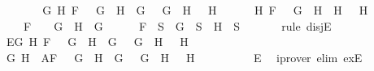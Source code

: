 \begin{isabellebody}
\ \isanewline
\ \ \ \ \isamarkupfalse%
\ {\isachardoublequoteopen}{\isacharparenleft}{\isasymexists}G{}\ H{}{\isachardot}\ F\ {\isacharequal}\ \isactrlbold {\isasymnot}\ {\isacharparenleft}G{}\ \isactrlbold {\isasymor}\ H{}{\isacharparenright}\ {\isasymand}\ G\ {\isacharequal}\ \isactrlbold {\isasymnot}\ G{}\ {\isasymand}\ H\ {\isacharequal}\ \isactrlbold {\isasymnot}\ H{}{\isacharparenright}\ {\isasymor}\ \isanewline
\ \ \ \ {\isacharparenleft}{\isacharparenleft}{\isasymexists}H{}{\isachardot}\ F\ {\isacharequal}\ \isactrlbold {\isasymnot}\ {\isacharparenleft}G\ \isactrlbold {\isasymrightarrow}\ H{}{\isacharparenright}\ {\isasymand}\ H\ {\isacharequal}\ \isactrlbold {\isasymnot}\ H{}{\isacharparenright}\ {\isasymor}\ \isanewline
\ \ \ \ F\ {\isacharequal}\ \isactrlbold {\isasymnot}\ {\isacharparenleft}\isactrlbold {\isasymnot}\ G{\isacharparenright}\ {\isasymand}\ H\ {\isacharequal}\ G{\isacharparenright}{\isachardoublequoteclose}\isanewline
\ \ \ \ \isamarkupfalse%
\ {\isachardoublequoteopen}F\ {\isasymin}\ S\ {\isasymlongrightarrow}\ G\ {\isasymin}\ S\ {\isasymand}\ H\ {\isasymin}\ S{\isachardoublequoteclose}\ \isanewline
\ \ \ \ \isamarkupfalse%
\ {\isacharparenleft}rule\ disjE{\isacharparenright}\isanewline
\ \ \ \ \ \ \isamarkupfalse%
\ E{}{\isacharcolon}{\isachardoublequoteopen}{\isasymexists}G{}\ H{}{\isachardot}\ F\ {\isacharequal}\ \isactrlbold {\isasymnot}\ {\isacharparenleft}G{}\ \isactrlbold {\isasymor}\ H{}{\isacharparenright}\ {\isasymand}\ G\ {\isacharequal}\ \isactrlbold {\isasymnot}\ G{}\ {\isasymand}\ H\ {\isacharequal}\ \isactrlbold {\isasymnot}\ H{}{\isachardoublequoteclose}\isanewline
\ \ \ \ \ \ \isamarkupfalse%
\ G{}\ H{}\ \ A{}{\isacharcolon}{\isachardoublequoteopen}F\ {\isacharequal}\ \isactrlbold {\isasymnot}\ {\isacharparenleft}G{}\ \isactrlbold {\isasymor}\ H{}{\isacharparenright}\ {\isasymand}\ G\ {\isacharequal}\ \isactrlbold {\isasymnot}\ G{}\ {\isasymand}\ H\ {\isacharequal}\ \isactrlbold {\isasymnot}\ H{}{\isachardoublequoteclose}\isanewline
\ \ \ \ \ \ \ \ \isamarkupfalse%
\ E{}\ \isamarkupfalse%
\ {\isacharparenleft}iprover\ elim{\isacharcolon}\ exE{\isacharparenright}\isanewline
\ \ \ \ \ \ \isamarkupfalse%

\end{isabellebody}
